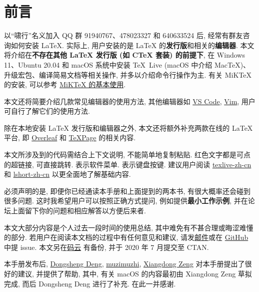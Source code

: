 
\chapter*{前言}

以``啸行''名义加入 QQ 群 91940767、478023327 和 640633524 后,
经常有群友咨询如何安装 \LaTeX.
实际上,
用户安装的是 \LaTeX{} 的\textbf{发行版}和相关的\textbf{编辑器}.
本文将介绍在\textbf{不存在其他 \LaTeX{} 发行版 (如 C\TeX{} 套装) 的前提下},
在 Windows 11、Ubuntu 20.04 和 macOS 系统中安装
\TeX{}~Live (macOS 中介绍 Mac\TeX)、升级宏包、编译简易文档等相关操作,
并多以介绍命令行操作为主.
有关 MiK\TeX{} 的安装,
可以参考 \href{https://camusecao.top/2020-05-09/MiKTeX/}{MiK\TeX{} 的基本使用}.

本文还将简要介绍几款常见编辑器的使用方法,
其他编辑器如 \href{https://code.visualstudio.com/}{VS Code},
\href{https://www.vim.org/}{Vim},
用户可自行了解它们的使用方法.

除在本地安装 \LaTeX{} 发行版和编辑器之外,
本文还将额外补充两款在线的 \LaTeX 平台,
即 \href{http://www.overleaf.com}{Overleaf} 和 \href{https://www.texpage.com/}{TeXPage} 的相关内容.

本文所涉及到的代码需结合上下文说明, 不能简单地复制粘贴. 红色文字都是可点的超链接, 可直接跳转.
 表示软件菜单.  表示键盘按键.
建议用户阅读 \href{https://www.tug.org/texlive/doc/texlive-zh-cn/texlive-zh-cn.pdf}{texlive-zh-cn}
和 \href{http://mirrors.ctan.org/info/lshort/chinese/lshort-zh-cn.pdf}{lshort-zh-cn}
以更全面地了解基础内容.

必须声明的是,
即便你已经通读本手册和上面提到的两本书,
有很大概率还会碰到很多问题.
这时我希望用户可以按照正确方式提问,
例如提供\textbf{最小工作示例},
并在论坛上面留下你的问题和相应解答以方便后来者.

本文大部分内容是个人过去一段时间的使用总结, 其中难免有不甚合理或晦涩难懂的部分. 
若用户在阅读本文档的过程中有任何意见和建议,
请发\href{mailto:ranwang.osbert@outlook.com}{邮件}或在
\href{https://github.com/OsbertWang/install-latex-guide-zh-cn/}{GitHub} 中提 issue.
本文另在\href{https://gitee.com/OsbertWang/install-latex-guide-zh-cn}{码云}%
有备份,
并于 2020 年 7 月提交至 CTAN.


本手册发布后,
\href{https://github.com/EthanDeng}{Dongsheng Deng},
\href{https://github.com/muzimuzhi}{muzimuzhi},
\href{https://github.com/stone-zeng}{Xiangdong Zeng}
对本手册提出了很好的建议, 并提供了帮助,
其中, 有关 macOS 的内容最初由 Xiangdong Zeng 草拟完成,
而后 Dongsheng Deng 进行了补充.
在此一并感谢.

